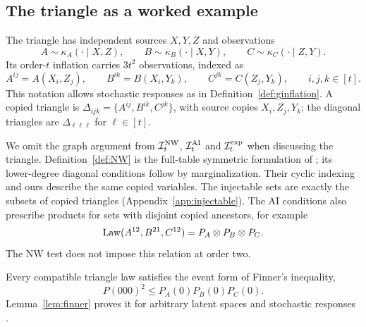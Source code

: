 \subsection{The triangle as a worked example}\label{sec:triangle}

The triangle has independent sources $X,Y,Z$ and observations
\[
A\sim\kappa_A(\cdot\mid X,Z),\qquad
B\sim\kappa_B(\cdot\mid X,Y),\qquad
C\sim\kappa_C(\cdot\mid Z,Y).
\]
Its order-$t$ inflation carries $3t^2$ observations, indexed as
\[
A^{ij}=A(X_i,Z_j),\qquad B^{ik}=B(X_i,Y_k),\qquad C^{jk}=C(Z_j,Y_k),\qquad i,j,k\in[t].
\]
This notation allows stochastic responses as in Definition~\ref{def:ginflation}. A copied triangle is $\Delta_{ijk}=\{A^{ij},B^{ik},C^{jk}\}$, with source copies $X_i,Z_j,Y_k$; the diagonal triangles are $\Delta_{\ell\ell\ell}$ for $\ell\in[t]$.



We omit the graph argument from $\mathcal I^{\mathrm{NW}}_t$, $\mathcal I^{\mathrm{AI}}_t$ and $\mathcal I^{\mathrm{exp}}_t$ when discussing the triangle. Definition~\ref{def:NW} is the full-table symmetric formulation of \cite[equations (16)--(19)]{NW2020}; its lower-degree diagonal conditions follow by marginalization. Their cyclic indexing and ours describe the same copied variables. The injectable sets are exactly the subsets of copied triangles (Appendix~\ref{app:injectable}). The AI conditions also prescribe products for sets with disjoint copied ancestors, for example
\[
\operatorname{Law}(A^{12},B^{21},C^{12})=P_A\otimes P_B\otimes P_C.
\]
The NW test does not impose this relation at order two.

Every compatible triangle law satisfies the event form of Finner's inequality,
\begin{equation}\label{eq:finner}
P(000)^2\le P_A(0)P_B(0)P_C(0).
\end{equation}
Lemma~\ref{lem:finner} proves it for arbitrary latent spaces and stochastic responses \cite{Finner1992,Renou2019}.
